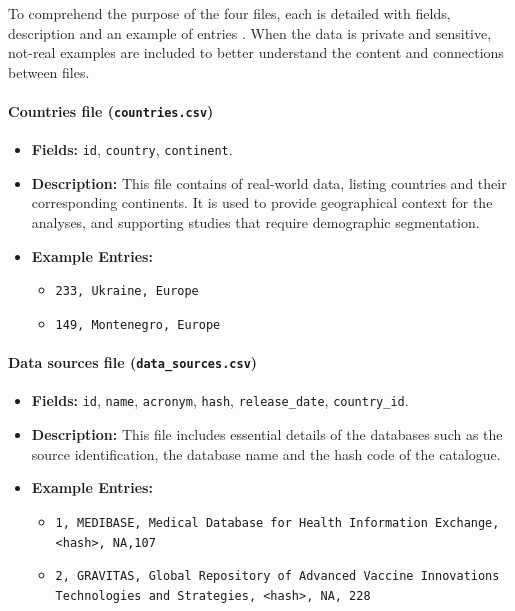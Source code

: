 To comprehend the purpose of the four files, each is detailed with fields, description and an example of entries \cite{almeida2024healthdbfinder}. When the data is private and sensitive, not-real examples are included to better understand the content and connections between files.

\paragraph{Countries file {\small\normalfont(\texttt{countries.csv})}}

\begin{itemize}
    \item \textbf{Fields:} \texttt{id}, \texttt{country}, \texttt{continent}.
    \item \textbf{Description:} This file contains of real-world data, listing countries and their corresponding continents. It is used to provide geographical context for the analyses, and supporting studies that require demographic segmentation.
    \item \textbf{Example Entries:}
    \begin{itemize}
        \item \texttt{233, Ukraine, Europe}
        \item \texttt{149, Montenegro, Europe}
    \end{itemize}
\end{itemize}


\paragraph{Data sources file {\small\normalfont(\texttt{data\_sources.csv})}}

\begin{itemize}
    \item {\raggedright\textbf{Fields:} \texttt{id}, \texttt{name}, \texttt{acronym}, \texttt{hash}, \texttt{release\_date}, \texttt{country\_id}.\par}
    \item \textbf{Description:} This file includes essential details of the databases such as the source identification, the database name and the hash code of the {\ehden} catalogue.
    \item \textbf{Example Entries:}
    \begin{itemize}
        \item \texttt{1, MEDIBASE, Medical Database for Health Information Exchange, <hash>, NA,107}
        \item \texttt{2, GRAVITAS, Global Repository of Advanced Vaccine Innovations Technologies and Strategies, <hash>, NA, 228}
    \end{itemize}
\end{itemize}

